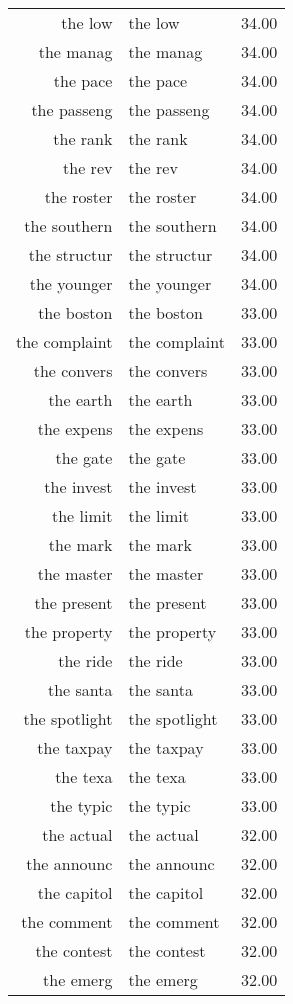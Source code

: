 \begin{table}[ht]
\begin{tabular}{rlr}
  the low & the low & 34.00 \\ 
  the manag & the manag & 34.00 \\ 
  the pace & the pace & 34.00 \\ 
  the passeng & the passeng & 34.00 \\ 
  the rank & the rank & 34.00 \\ 
  the rev & the rev & 34.00 \\ 
  the roster & the roster & 34.00 \\ 
  the southern & the southern & 34.00 \\ 
  the structur & the structur & 34.00 \\ 
  the younger & the younger & 34.00 \\ 
  the boston & the boston & 33.00 \\ 
  the complaint & the complaint & 33.00 \\ 
  the convers & the convers & 33.00 \\ 
  the earth & the earth & 33.00 \\ 
  the expens & the expens & 33.00 \\ 
  the gate & the gate & 33.00 \\ 
  the invest & the invest & 33.00 \\ 
  the limit & the limit & 33.00 \\ 
  the mark & the mark & 33.00 \\ 
  the master & the master & 33.00 \\ 
  the present & the present & 33.00 \\ 
  the property & the property & 33.00 \\ 
  the ride & the ride & 33.00 \\ 
  the santa & the santa & 33.00 \\ 
  the spotlight & the spotlight & 33.00 \\ 
  the taxpay & the taxpay & 33.00 \\ 
  the texa & the texa & 33.00 \\ 
  the typic & the typic & 33.00 \\ 
  the actual & the actual & 32.00 \\ 
  the announc & the announc & 32.00 \\ 
  the capitol & the capitol & 32.00 \\ 
  the comment & the comment & 32.00 \\ 
  the contest & the contest & 32.00 \\ 
  the emerg & the emerg & 32.00 \\ 

\end{tabular}
\end{table}
